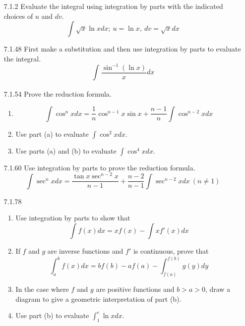 \documentclass{article}
\begin{document}
\begin{enumerate}
\item[7.1.2]
    Evaluate the integral using integration by parts with the indicated choices of $u$
    and $dv$.
    \[
        \int \sqrt{x} \ln x dx;\ u = \ln x,\ dv = \sqrt{x}dx
    \]

\vspace{5cm}

\item[7.1.48]
    First make a substitution and then use integration by parts to evaluate the integral.
    \[
        \int_{}^{} \frac{\sin^{-1} (\ln x)}{x} dx
    \]

\vspace{5cm}

\item[7.1.54]
    Prove the reduction formula.
    \begin{enumerate}
        \item
        \[
            \int \cos^{n} x dx = \frac{1}{n} \cos^{n-1} x \sin x
            + \frac{n-1}{n}\int \cos^{n-2} x dx
        \]
        \item Use part (a) to evaluate $\displaystyle \int \cos^{2} x dx$.
        \item Use parts (a) and (b) to evaluate $\displaystyle \int \cos^{4} x dx$.
    \end{enumerate}

\newpage

\item[7.1.60]
    Use integration by parts to prove the reduction formula.
    \[
        \int \sec^{n} x dx = \frac{\tan x \sec^{n-2} x }{n-1}
        + \frac{n-2}{n-1}\int \sec^{n-2} x dx\ ( n \neq 1 )
    \]

\vspace{5cm}

\item[7.1.78]
    \begin{enumerate}
        \item Use integration by parts to show that
        \[
            \int f(x) dx = x f(x) - \int xf'(x) dx
        \]
        \item If $f$ and $g$ are inverse functions and $f'$ is
            continuous, prove that
        \[
            \int_{a}^{b} f(x) dx = b f(b) - a f(a) -
            \int_{f(a)}^{f(b)} g(y) dy
        \]
        \item In the case where $f$ and $g$ are positive functions and
            $b > a > 0$, draw a diagram to give a geometric
            interpretation of part (b).
        \item Use part (b) to evaluate $\displaystyle \int_{1}^{e} \ln x dx$.
    \end{enumerate}


\end{enumerate}
\end{document}
